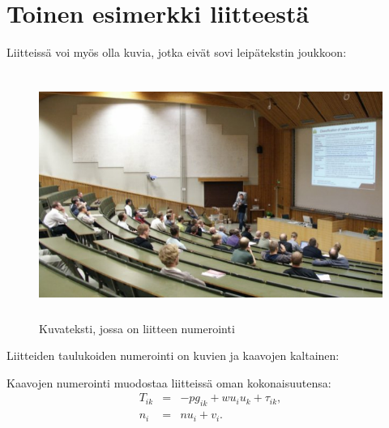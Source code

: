 \documentclass[english,12pt,a4paper,pdftex,elec,utf8]{aaltothesis}
\begin{document}
\clearpage
\section{Toinen esimerkki liitteest\"a\label{LiiteB}}


Liitteiss\"a voi my\"os olla kuvia, jotka
eiv\"at sovi leip\"atekstin joukkoon:
\begin{figure}[htb]
\begin{center}
\includegraphics[height=8cm]{kuva2}
\end{center}
\caption{Kuvateksti, jossa on liitteen numerointi}
\label{liitekuva}
\end{figure}
Liitteiden taulukoiden numerointi on kuvien ja kaavojen kaltainen:
\begin{table}[htb]
\caption{Taulukon kuvateksti.}
\label{liitetaulukko}
\begin{center}
\end{center}
\end{table}
Kaavojen numerointi muodostaa liitteiss\"a oman kokonaisuutensa:
\begin{eqnarray}
T_{ik} &=& -p g_{ik} + w u_i u_k + \tau_{ik},  \label{liitekaava3} \\
n_i    &=& n u_i + v_i.                      \label{liitekaava4}
\end{eqnarray}
\end{document}
